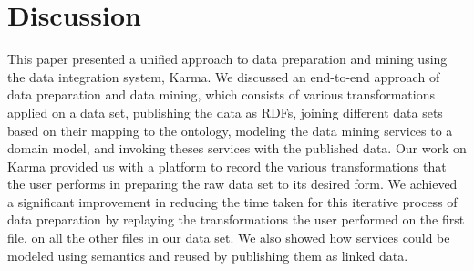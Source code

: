 \section{Discussion}
This paper presented a unified approach to data preparation and mining using the data integration system, Karma. We discussed an end-to-end approach of data preparation and data mining, which consists of various transformations applied on a data set, publishing the data as RDFs, joining different data sets based on their mapping to the ontology, modeling the data mining services to a domain model, and invoking theses services with the published data. Our work on Karma provided us with a platform to record the various transformations that the user performs in preparing the raw data set to its desired form. We achieved a significant improvement in reducing the time taken for this iterative process of data preparation by replaying the transformations the user performed on the first file, on all the other files in our data set. We also showed how services could be modeled using semantics and reused by publishing them as linked data.